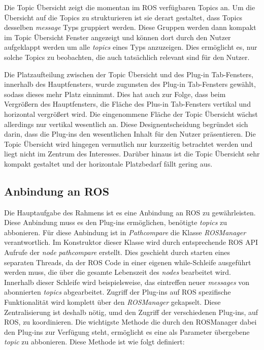 Die Topic Übersicht zeigt die momentan im \gls{ROS} verfügbaren Topics an. 
Um die Übersicht auf die Topics zu strukturieren ist sie derart
gestaltet, dass Topics desselben \textit{message} Typs gruppiert werden. Diese
Gruppen werden dann kompakt im Topic Übersicht Fenster angezeigt und können dort durch
den Nutzer aufgeklappt werden um alle \textit{topics} eines Typs anzuzeigen.
Dies ermöglicht es, nur solche Topics zu beobachten, die auch
tatsächlich relevant sind für den Nutzer. 

Die Platzaufteilung zwischen der Topic Übersicht und des Plug-in Tab-Fensters,
innerhalb des Hauptfensters, wurde zugunsten des Plug-in Tab-Fensters gewählt,
sodass dieses mehr Platz einnimmt.  Dies hat auch zur Folge, dass beim Vergrößern
des Hauptfensters, die Fläche des Plus-in Tab-Fensters vertikal und horizontal
vergrößert wird. Die eingenommene Fläche der Topic Übersicht wächst allerdings
nur vertikal wesentlich an. Diese Designentscheidung begründet sich darin,
dass die Plug-ins den wesentlichen Inhalt für den Nutzer präsentieren. Die
Topic Übersicht wird hingegen vermutlich nur kurzzeitig betrachtet werden und
liegt nicht im Zentrum des Interesses. Darüber hinaus ist die Topic Übersicht
sehr kompakt gestaltet und der horizontale Platzbedarf fällt gering aus.



\subsection{Anbindung an ROS}

Die Hauptaufgabe des Rahmens ist es eine Anbindung an ROS zu gewährleisten.
Diese Anbindung muss es den Plug-ins ermöglichen, benötigte \textit{topics} zu
abbonieren. Für diese Anbindung ist in \textit{Pathcompare} die Klasse
\textit{ROSManager} verantwortlich. Im Konstruktor dieser Klasse wird durch
entsprechende \gls{ROS} API Aufrufe der \textit{node} \textit{pathcompare}
erstellt. Dies geschieht durch starten eines separaten Threads, da der ROS Code
in einer eigenen while-Schleife ausgeführt werden muss, die über die gesamte
Lebenszeit des \textit{nodes} bearbeitet wird. Innerhalb dieser Schleife wird
beispielsweise, das eintreffen neuer \textit{messages} von abonnierten
\textit{topics} abgearbeitet.
Zugriff der Plug-ins auf ROS spezifische Funktionalität wird komplett über den
\textit{ROSManager} gekapselt. Diese Zentralisierung ist deshalb nötig, umd den Zugriff
der verschiedenen Plug-ins, auf ROS, zu koordinieren. 
Die wichtigste Methode die durch den ROSManager dabei den Plug-ins zur
Verfügung steht, ermöglicht es eine als Parameter übergebene \textit{topic} zu
abbonieren. 
Diese Methode ist wie folgt definiert:

